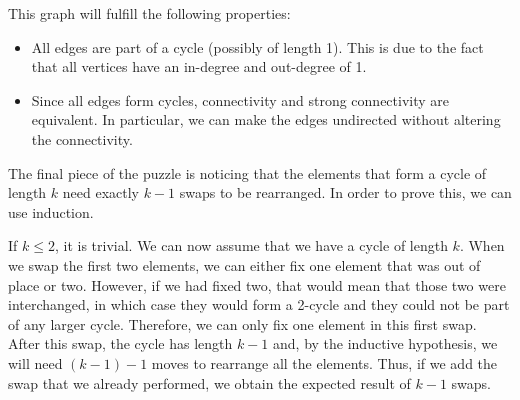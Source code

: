 \begin{figure}[h!]
\centering
\begin{subfigure}[c]{0.4\textwidth}
\centering
{}
		
\end{subfigure}
\begin{subfigure}[c]{0.4\textwidth}
\centering
{}
\end{subfigure}
\end{figure}
This graph will fulfill the following properties:
\begin{itemize}
		\setlength{\itemsep}{2pt}
		\item All edges are part of a cycle (possibly of length 1). 
				This is due to the fact that all vertices have an 
				in-degree and out-degree of 1.
		\item Since all edges form cycles,  connectivity and
				strong connectivity are equivalent. In particular, 
				we can make the edges undirected without altering 
				the connectivity.
\end{itemize}

The final piece of the puzzle is noticing that the elements that 
form a cycle of length $k$ need exactly $k-1$ swaps to be rearranged.
In order to prove this, we can use induction. 

If $k\le 2$, it is trivial. We can now assume that we have a cycle of
length $k$. When we swap the first two elements, we can either fix
one element that was out of place or two. However, if we had fixed
two, that would mean that those two were interchanged, in which
case they would form a 2-cycle and they could not be part of any
larger cycle. Therefore, we can only fix one element in this first
swap. After this swap, the cycle has length $k-1$ and, by
the inductive hypothesis, we will need $(k-1)-1$ moves to rearrange
all the elements. Thus, if we add the swap that we already performed,
we obtain the expected result of $k-1$ swaps.

